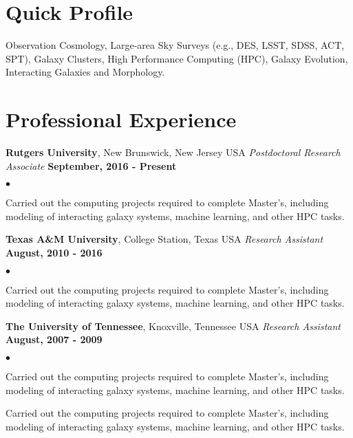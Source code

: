 \documentclass[margin,line, 11pt]{res}
\newenvironment{list2}{
  \begin{list}{$\bullet$}{%
      \setlength{\itemsep}{0in}
      \setlength{\parsep}{0in} \setlength{\parskip}{0in}
      \setlength{\topsep}{0in} \setlength{\partopsep}{0in} 
      \setlength{\leftmargin}{0.2in}}}{\end{list}}
\begin{document}
\begin{resume}
\section{Quick Profile}
Observation Cosmology, Large-area Sky Surveys (e.g., DES, LSST, SDSS, ACT, SPT), Galaxy Clusters, High Performance Computing (HPC), Galaxy Evolution, Interacting Galaxies and Morphology.
\vspace*{-3mm}

\section{Professional Experience}
\textbf{Rutgers University}, New Brunswick, New Jersey USA \newline
\textit{Postdoctoral Research Associate} \hfill \textbf{September, 2016 - Present}\newline
    \begin{list2}
    	\vspace*{-5mm}
    	\item Carried out the computing projects required to complete Master's, including modeling of interacting galaxy systems, machine learning, and other HPC tasks.
    \end{list2}
\vspace*{-5mm}

\textbf{Texas A\&M University}, College Station, Texas USA\newline
\textit{Research Assistant} \hfill \textbf{August, 2010 - 2016}\newline
    \begin{list2}
    	\vspace*{-5mm}
    	\item Carried out the computing projects required to complete Master's, including modeling of interacting galaxy systems, machine learning, and other HPC tasks.
    \end{list2}
\vspace*{-5mm}

\textbf{The University of Tennessee}, Knoxville, Tennessee USA\newline
\textit{Research Assistant} \hfill \textbf{August, 2007 - 2009}\newline
    \begin{list2}
    	\vspace*{-5mm}
    	\item Carried out the computing projects required to complete Master's, including modeling of interacting galaxy systems, machine learning, and other HPC tasks.
    	\item Carried out the computing projects required to complete Master's, including modeling of interacting galaxy systems, machine learning, and other HPC tasks.
    \end{list2}
\vspace*{-5mm}


\end{resume}
\end{document}

